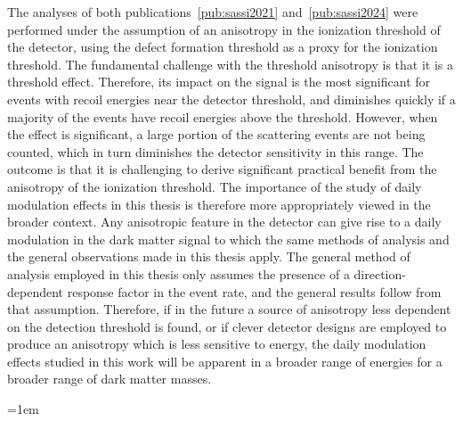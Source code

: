 The analyses of both publications~\ref{pub:sassi2021} and~\ref{pub:sassi2024} were performed under the assumption of an anisotropy in the ionization threshold of the detector, using the defect formation threshold as a proxy for the ionization threshold. The fundamental challenge with the threshold anisotropy is that it is a threshold effect. Therefore, its impact on the signal is the most significant for events with recoil energies near the detector threshold, and diminishes quickly if a majority of the events have recoil energies above the threshold. However, when the effect is significant, a large portion of the scattering events are not being counted, which in turn diminishes the detector sensitivity in this range. The outcome is that it is challenging to derive significant practical benefit from the anisotropy of the ionization threshold. The importance of the study of daily modulation effects in this thesis is therefore more appropriately viewed in the broader context. Any anisotropic feature in the detector can give rise to a daily modulation in the dark matter signal to which the same methods of analysis and the general observations made in this thesis apply. The general method of analysis employed in this thesis only assumes the presence of a direction-dependent response factor in the event rate, and the general results follow from that assumption. Therefore, if in the future a source of anisotropy less dependent on the detection threshold is found, or if clever detector designs are employed to produce an anisotropy which is less sensitive to energy, the daily modulation effects studied in this work will be apparent in a broader range of energies for a broader range of dark matter masses.

\backmatter

\emergencystretch=1em
\printbibliography[heading = bibintoc, title = References]


